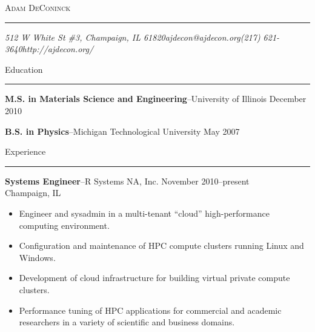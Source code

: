\documentclass[10pt]{article}
\makeatletter
\newcommand{\name}{Adam DeConinck}
\newcommand{\addr}{512 W White St \#3, Champaign, IL 61820}
\newcommand{\phone}{(217) 621-3640}
\newcommand{\email}{ajdecon@ajdecon.org}
\newcommand{\website}{http://ajdecon.org/}
\newcommand{\linkedin}{http://www.linkedin.com/in/ajdecon}
\newcommand{\bigname}[1]{
	\begin{center}\fontfamily{phv}\selectfont\Huge\scshape#1\end{center}
}
\newcommand{\bigsection}[1]{	
	\vspace{4pt}
	{\fontfamily{phv}\selectfont\Large#1}

	\vspace{-10pt} \rule{\textwidth}{1pt}
}
\newcommand{\jobitem}[4]{
    \vspace{4pt}

    \textbf{#1}--#2 \hfill #3\\ #4

    \vspace{-8pt}
}
\makeatother
\begin{document}
 \selectfont

\bigname{\name}

\vspace{-8pt} \rule{\textwidth}{1pt}

\vspace{-1pt} {\small\itshape \addr \hfill \email \hfill \phone \hfill \website} %

\vspace{16pt}
\bigsection{Education}
\vspace{-10pt}

\textbf{M.S. in Materials Science and Engineering}--University of Illinois \hfill December 2010

\textbf{B.S. in Physics}--Michigan Technological University \hfill May 2007


\vspace{4pt}
\bigsection{Experience}

\vspace{-10pt}

\jobitem{Systems Engineer}{R Systems NA, Inc.}{November 2010--present}{Champaign, IL}

\begin{itemize}\setlength{\itemsep}{0cm}
  \setlength{\parskip}{0cm}

\item Engineer and sysadmin in a multi-tenant ``cloud'' high-performance computing environment.
\item Configuration and maintenance of HPC compute clusters running Linux and Windows.
\item Development of cloud infrastructure for building virtual private compute clusters.
\item Performance tuning of HPC applications for commercial and academic researchers in a variety of scientific and 
business domains.

\end{itemize}
\end{document}
